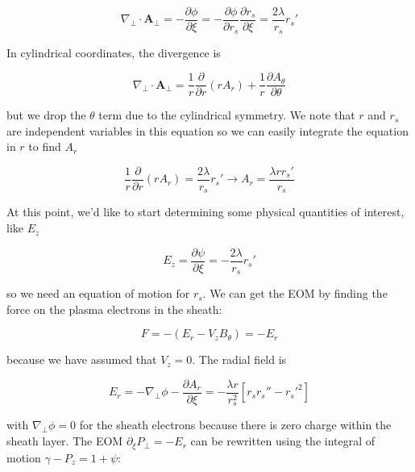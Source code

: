\documentclass[aps,prl,preprint,groupedaddress]{revtex4-1}
\begin{document}
\begin{equation}\label{eq:a_perp}
\nabla_\perp \cdot \mathbf{A}_\perp = -\frac{\partial \phi}{\partial \xi} = - \frac{\partial \phi}{\partial r_s}\frac{\partial r_s}{\partial \xi} = \frac{2\lambda}{r_s}r_s'
\end{equation}

In cylindrical coordinates, the divergence is

\begin{equation}\label{eq:a_perp_cyl}
\nabla_\perp \cdot \mathbf{A}_\perp = \frac{1}{r}\frac{\partial}{\partial r} (r A_r) + \frac{1}{r}\frac{\partial A_{\theta}}{\partial \theta}
\end{equation}

but we drop the $\theta$ term due to the cylindrical symmetry. We note that $r$ and $r_s$ are independent variables in this equation so we can easily integrate the equation in $r$ to find $A_r$

\begin{equation}\label{eq:a_r}
\frac{1}{r}\frac{\partial}{\partial r} (r A_r) = \frac{2\lambda}{r_s}r_s' \rightarrow A_r = \frac{\lambda r r_s'}{r_s}
\end{equation}

At this point, we'd like to start determining some physical quantities of interest, like $E_z$

\begin{equation}\label{eq:E_z}
E_z = \frac{\partial \psi}{\partial \xi} = -\frac{2\lambda}{r_s}r_s'
\end{equation}

so we need an equation of motion for $r_s$. We can get the EOM by finding the force on the plasma electrons in the sheath:

\begin{equation}\label{eq:force}
F =-(E_r -V_z B_{\theta}) = -E_r
\end{equation}

because we have assumed that $V_z = 0$. The radial field is

\begin{equation}\label{eq:force}
E_r =-\nabla_{\perp} \phi - \frac{\partial A_r}{\partial \xi} = -\frac{\lambda r}{r_s^2}[r_s r_s'' - r_s'^2]
\end{equation}

with $\nabla_{\perp} \phi = 0$ for the sheath electrons because there is zero charge within the sheath layer. The EOM $\partial_{\xi} P_{\perp} = -E_r$ can be rewritten using the integral of motion $\gamma - P_z = 1 + \psi$:
\end{document}
